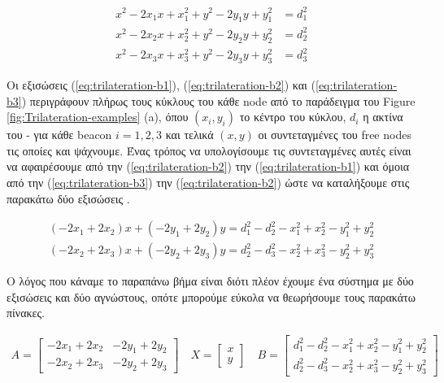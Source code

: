 \begin{align}
	x^2-2 x_1 x + x_1^2 + y^2-2 y_1 y + y_1^2 &= d_1^2 \label{eq:trilateration-b1} \\ 
	x^2-2 x_2 x + x_2^2 + y^2-2 y_2 y + y_2^2 &= d_2^2 \label{eq:trilateration-b2} \\
	x^2-2 x_3 x + x_3^2 + y^2-2 y_3 y + y_3^2 &= d_3^2 \label{eq:trilateration-b3} 
\end{align}

Οι εξισώσεις (\ref{eq:trilateration-b1}), (\ref{eq:trilateration-b2}) και (\ref{eq:trilateration-b3}) περιγράφουν πλήρως τους κύκλους του κάθε node από το παράδειγμα 
του Figure \ref{fig:Trilateration-examples} (a),
όπου $(x_i,y_i)$ το κέντρο του κύκλου, $d_i$ η ακτίνα του - για κάθε beacon $i=1,2,3$ και τελικά $(x,y)$ οι συντεταγμένες του free nodes τις οποίες και ψάχνουμε. 
Ένας τρόπος να υπολογίσουμε τις συντεταγμένες αυτές είναι να αφαιρέσουμε από την (\ref{eq:trilateration-b2}) την (\ref{eq:trilateration-b1}) και όμοια από την 
(\ref{eq:trilateration-b3}) την (\ref{eq:trilateration-b2}) ώστε να καταλήξουμε στις παρακάτω δύο εξισώσεις \cite{trilateration-equations} \cite{localization-algorithms-for-wsn}.

\begin{align}
	(-2x_1+2x_2)x + (-2y_1+2y_2)y = d_1^2 - d_2^2 - x_1^2 + x_2^2 - y_1^2 + y_2^2  \nonumber \\
	(-2x_2+2x_3)x + (-2y_2+2y_3)y = d_2^2 - d_3^2 - x_2^2 + x_3^2 - y_2^2 + y_3^2  \nonumber
\end{align}

Ο λόγος που κάναμε το παραπάνω βήμα είναι διότι πλέον έχουμε ένα σύστημα με δύο εξισώσεις και δύο αγνώστους, οπότε μπορούμε εύκολα να θεωρήσουμε τους παρακάτω πίνακες.

\begin{align}
	A = \begin{bmatrix} -2x_1+2x_2 & -2y_1+2y_2 \\ -2x_2+2x_3 & -2y_2+2y_3 \end{bmatrix} \nonumber \quad
	X = \begin{bmatrix} x \\ y \end{bmatrix} \nonumber \quad
	B = \begin{bmatrix} d_1^2 - d_2^2 - x_1^2 + x_2^2 - y_1^2 + y_2^2 \\ d_2^2 - d_3^2 - x_2^2 + x_3^2 - y_2^2 + y_3^2 \end{bmatrix} \nonumber
\end{align}

